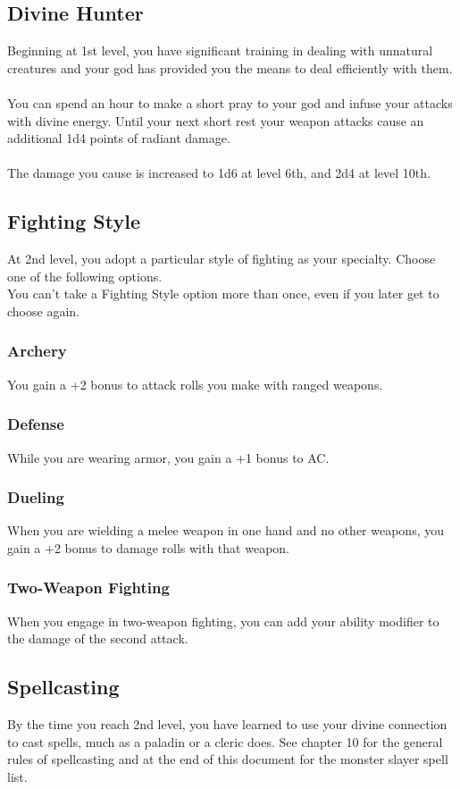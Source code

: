 \documentclass[11pt,a4paper,twocolumn, sans]{article}
\begin{document}
	\subsection*{Divine Hunter}
	Beginning at 1st level, you have significant training in dealing with unnatural creatures and your god has provided you the means to deal efficiently with them. \\ \\
	You can spend an hour to make a short pray to your god and infuse your attacks with divine energy. Until your next short rest your weapon attacks cause an additional 1d4 points of radiant damage. \\ \\
	The damage you cause is increased to 1d6 at level 6th, and 2d4 at level 10th.
	
	\subsection*{Fighting Style}
	At 2nd level, you adopt a particular style of fighting as your specialty. Choose one of the following options. \\
	You can’t take a Fighting Style option more than once, even if you later get to choose again.
	
	\subsubsection*{Archery}
	You gain a +2 bonus to attack rolls you make with ranged weapons.
	\subsubsection*{Defense}
	While you are wearing armor, you gain a +1 bonus to AC.
	\subsubsection*{Dueling}
	When you are wielding a melee weapon in one hand and no other weapons, you gain a +2 bonus to damage rolls with that weapon.
	\subsubsection*{Two-Weapon Fighting}
	When you engage in two-weapon fighting, you can add your ability modifier to the damage of the second attack.
	
	\subsection*{Spellcasting}
	By the time you reach 2nd level, you have learned to use your divine connection to cast spells, much as a paladin or a cleric does. See chapter 10 for the general rules of spellcasting and at the end of this document for the monster slayer spell list.
\end{document}
